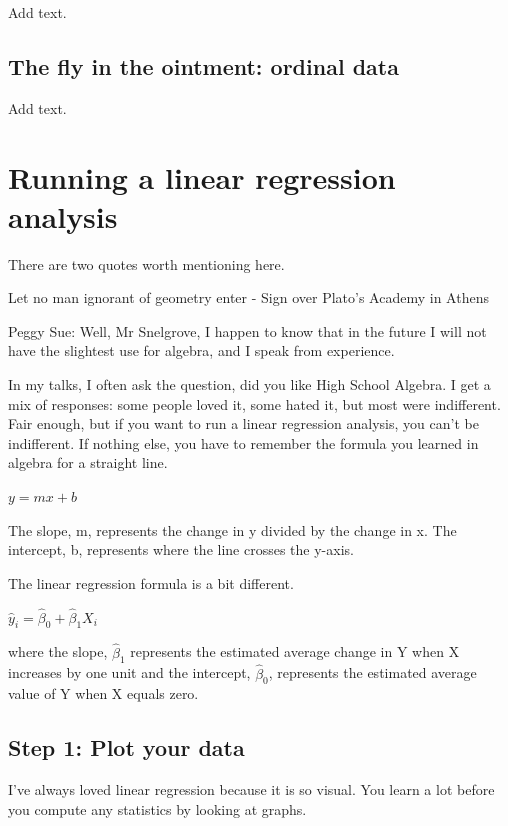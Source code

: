 \documentclass[
  letterpaper,
  DIV=11,
  numbers=noendperiod]{scrreprt}
\begin{document}
Add text.

\section{The fly in the ointment: ordinal
data}\label{the-fly-in-the-ointment-ordinal-data}

Add text.


\chapter{Running a linear regression
analysis}\label{running-a-linear-regression-analysis}

There are two quotes worth mentioning here.

Let no man ignorant of geometry enter - Sign over Plato's Academy in
Athens

Peggy Sue: Well, Mr Snelgrove, I happen to know that in the future I
will not have the slightest use for algebra, and I speak from
experience.

In my talks, I often ask the question, did you like High School Algebra.
I get a mix of responses: some people loved it, some hated it, but most
were indifferent. Fair enough, but if you want to run a linear
regression analysis, you can't be indifferent. If nothing else, you have
to remember the formula you learned in algebra for a straight line.

\(y = mx + b\)

The slope, m, represents the change in y divided by the change in x. The
intercept, b, represents where the line crosses the y-axis.

The linear regression formula is a bit different.

\(\hat{y}_i=\hat\beta_0+\hat\beta_1 X_i\)

where the slope, \(\hat\beta_1\) represents the estimated average change
in Y when X increases by one unit and the intercept, \(\hat\beta_0\),
represents the estimated average value of Y when X equals zero.

\section{Step 1: Plot your data}\label{step-1-plot-your-data}

I've always loved linear regression because it is so visual. You learn a
lot before you compute any statistics by looking at graphs.
\end{document}
